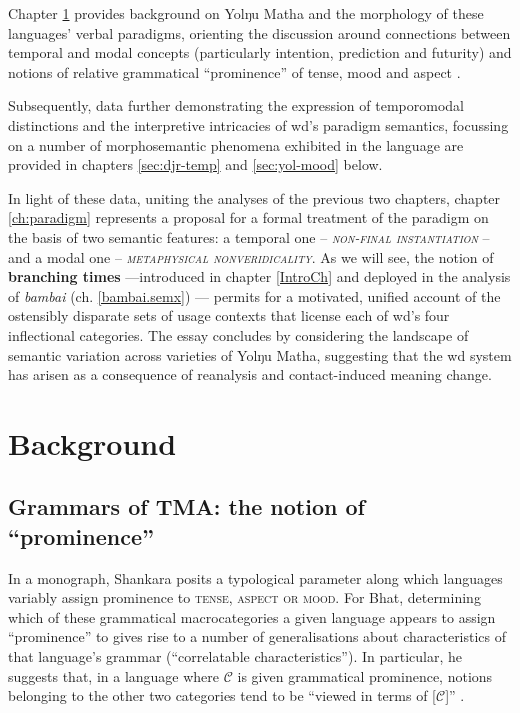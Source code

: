 Chapter \ref{yol-bkgd} provides background on Yolŋu Matha and the morphology of these languages' verbal paradigms, orienting the discussion around connections between temporal and modal concepts (particularly intention, prediction and futurity) and notions of relative grammatical ``prominence'' of tense, mood and aspect \citep[\textit{cf.}][]{Bhat1999}. %



Subsequently, data further demonstrating the expression of temporomodal distinctions and the interpretive intricacies of \acrshort{wd}'s paradigm semantics, focussing on a number of morphosemantic phenomena exhibited in the language are provided in chapters \ref{sec:djr-temp} and \ref{sec:yol-mood} below. 

In light of these data, uniting the analyses of the previous two chapters, chapter \ref{ch:paradigm} represents a proposal for a formal treatment of the paradigm on the basis of two semantic features: a temporal one -- \textsc{\textit{non-final instantiation}} -- and a modal one -- \textsc{\textit{metaphysical nonveridicality}}. As we will see, the notion of \textbf{branching times} ---introduced in chapter \ref{IntroCh} and deployed in the analysis of \textit{bambai} (ch. \ref{bambai.semx}) --- permits for a motivated, unified account of the ostensibly disparate sets of usage contexts that license each of \gls{wd}'s four inflectional categories. The essay concludes by considering the landscape of semantic variation across varieties of Yolŋu Matha, suggesting that the \gls{wd} system has arisen as a consequence of reanalysis and contact-induced meaning change.

\chapter{Background}\label{yol-bkgd}

\section{Grammars of TMA: the notion of ``prominence''}

In a \citeyear{Bhat1999} monograph, Shankara \citeauthor{Bhat1999} posits a typological parameter along which languages variably assign prominence to \textsc{tense, aspect \textup{or} mood}. For Bhat, determining which of these grammatical macrocategories a given language appears to assign ``prominence'' to gives rise to a number of generalisations about characteristics of that language's grammar (``correlatable characteristics''). In particular, he suggests that, in a language where $ \mathcal C $ is given grammatical prominence, notions belonging to the other two categories tend to be ``viewed in terms of [$ \mathcal C $]'' \citeyearpar[7]{Bhat1999}.


